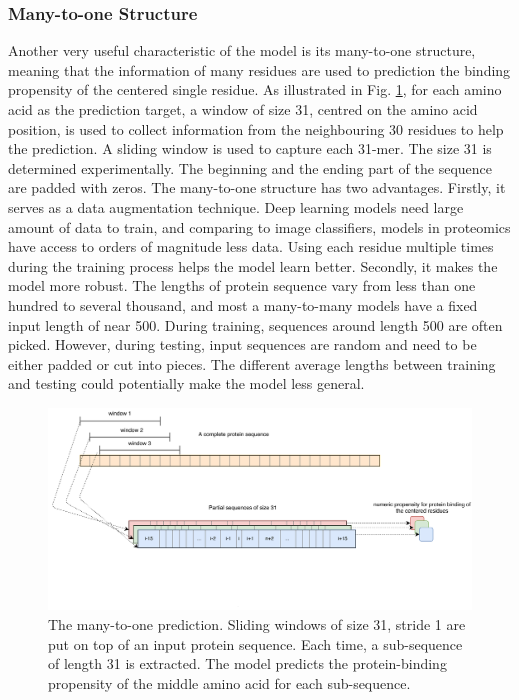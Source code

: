 \subsubsection{Many-to-one Structure}
Another very useful characteristic of the model is its many-to-one structure, meaning that the information of many residues are used to prediction the binding propensity of the centered single residue. As illustrated in Fig. \ref{fig_many2one}, for each amino acid as the prediction target, a window of size 31, centred on the amino acid position, is used to collect information from the neighbouring 30 residues to help the prediction. A sliding window is used to capture each 31-mer. The size 31 is determined experimentally. The beginning and the ending part of the sequence are padded with zeros. The many-to-one structure has two advantages. Firstly, it serves as a data augmentation technique. Deep learning models need large amount of data to train, and comparing to image classifiers, models in proteomics have access to orders of magnitude less data. Using each residue multiple times during the training process helps the model learn better. Secondly, it makes the model more robust. The lengths of protein sequence vary from less than one hundred to several thousand, and most a many-to-many models have a fixed input length of near 500. During training, sequences around length 500 are often picked. However, during testing, input sequences are random and need to be either padded or cut into pieces. The different average lengths between training and testing could potentially make the model less general. 
\begin{figure}
\centering
\includegraphics[width=\textwidth]{img/many_2_one.pdf}
  \caption[The many-to-one prediction]{The many-to-one prediction. Sliding windows of size 31, stride 1 are put on top of an input protein sequence. Each time, a sub-sequence of length 31 is extracted. The model predicts the protein-binding propensity of the middle amino acid for each sub-sequence.
  \label{fig_many2one}}
\end{figure}
